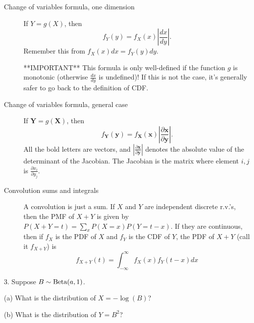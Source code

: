 \documentclass{article}
\begin{document}
\begin{description}
    \item[Change of variables formula, one dimension] If $Y = g(X)$, then $$f_Y(y) = f_X(x)\left|\frac{dx}{dy}\right|.$$
    Remember this from $f_X(x)dx = f_Y(y)dy$.

    **IMPORTANT** This formula is only well-defined if the function $g$ is monotonic (otherwise $\frac{dx}{dy}$ is undefined)! If this is not the case, it's generally safer to go back to the definition of CDF.
    
    \item[Change of variables formula, general case] If $\mathbf{Y} = g(\mathbf{X})$, then $$f_\mathbf{Y}(\mathbf{y}) = f_\mathbf{X}(\mathbf{x})\left|\frac{\partial \mathbf{x}}{\partial \mathbf{y}}\right|.$$
    All the bold letters are vectors, and $\left|\frac{\partial \mathbf{x}}{\partial \mathbf{y}}\right|$ denotes the absolute value of the determinant of the Jacobian. The Jacobian is the matrix where element $i, j$ is $\frac{\partial x_i}{\partial y_j}$.
    
    \item[Convolution sums and integrals] A convolution is just a sum. If $X$ and $Y$ are independent discrete r.v.'s, then the PMF of $X+Y$ is given by $P(X+Y=t) = \sum_x P(X=x)P(Y=t-x)$. If they are continuous, then if $f_X$ is the PDF of $X$ and $f_Y$ is the CDF of $Y$, the PDF of $X+Y$ (call it $f_{X+Y}$) is 
    $$f_{X+Y}(t) = \int_{-\infty}^{\infty} f_X(x)f_Y(t-x) dx
    $$
\end{description}

\vspace{20mm}

3. Suppose $B \sim \textrm{Beta}(a, 1)$. 

(a) What is the distribution of $X = -\log(B)$? 



(b) What is the distribution of $Y = B^2$?


\end{document}
